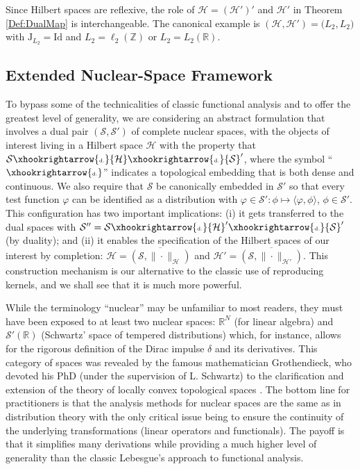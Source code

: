 \documentclass[11pt, english,english]{article}
\newcommand{\R}{ \mathbb{R}}
\newcommand{\Z}{ \mathbb{Z}}
\def\V#1{{\boldsymbol{#1}}}         %
\def\Spc#1{{\mathcal{#1}}}  %
\def\Op#1{{\mathrm{#1}}}  %
\def\Identity{\mathrm{Id}} %
\newcommand{\embedD}{\xhookrightarrow{\mbox{\tiny \rm d.}}}
\renewcommand{\[}{\begin{equation}}
\renewcommand{\]}[1]{\label{eq:#1}\end{equation}}
\begin{document}
Since Hilbert spaces are reflexive, the role of $\Spc H=(\Spc H')'$ and $\Spc H'$ in Theorem \ref{Def:DualMap}
is interchangeable. 
The canonical example is $(\Spc H, \Spc H')=\big(L_2,L_2\big)$ with $\Op J_{L_2}=\Identity$
and $L_2=\ell_2(\Z)$ or $L_2=L_2(\R)$. 

\subsection{Extended Nuclear-Space Framework}
To bypass some of the technicalities of classic functional analysis and to offer the greatest level of generality, we are considering an abstract formulation that involves a dual pair $(\Spc S, \Spc S')$ of complete nuclear spaces, with the objects of interest living in a Hilbert space $\Spc H$ with the property that $ \Spc S\embedD \Spc H \embedD \Spc S'$, where the symbol ``$\embedD$'' indicates a topological embedding that is both dense and continuous. We also require that $\Spc S$ be canonically embedded in $\Spc S'$ so that every test function $\varphi$ can be identified as a
distribution with $\varphi \in \Spc S': \phi \mapsto \langle \varphi, \phi\rangle$, $\phi \in \Spc S'$. This configuration has two important implications: (i) it gets transferred to the dual spaces with  
$\Spc S''=\Spc S \embedD \Spc H' \embedD \Spc S'$ (by duality); and (ii) it enables the specification of the Hilbert spaces of our interest by completion: $\Spc H=\overline{(\Spc S,\|\cdot\|_{\Spc H})}$
and $\Spc H'=\overline{(\Spc S,\|\cdot\|_{\Spc H'})}$.
This construction mechanism is our alternative to the classic use of reproducing kernels, and we shall see that it is much more powerful.

While the terminology ``nuclear'' may be unfamiliar to most readers, they must have been exposed to at least two nuclear spaces: $\R^N$ (for linear algebra) and $\Spc S'(\R)$ (Schwartz' space of tempered distributions) which, for instance, allows for the rigorous definition of the Dirac impulse $\delta$ and its derivatives. This category of spaces was revealed by the famous mathematician Grothendieck, who devoted his PhD (under the supervision of L. Schwartz) to the clarification and extension of the theory of locally convex topological spaces \cite{Grothendieck1955}. 
The bottom line for practitioners is that the analysis methods for nuclear spaces are the same as in distribution theory with the only critical issue being 
to ensure the continuity of the underlying transformations (linear operators and functionals).
The payoff is that it simplifies many derivations while providing a much higher level of generality than the classic Lebesgue's approach to functional analysis.
\end{document}
